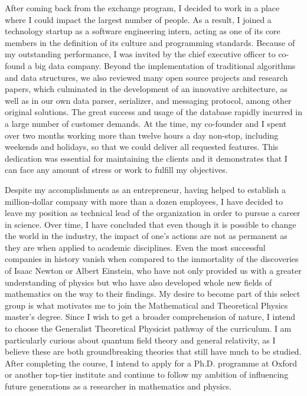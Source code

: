 \documentclass[10pt]{article}
\begin{document}
After coming back from the exchange program, I decided to work in a place where I could impact the largest number of people. As a result, I joined a technology startup as a software engineering intern, acting as one of its core members in the definition of its culture and programming standards. Because of my outstanding performance, I was invited by the chief executive officer to co-found a big data company. Beyond the implementation of traditional algorithms and data structures, we also reviewed many open source projects and research papers, which culminated in the development of an innovative architecture, as well as in our own data parser, serializer, and messaging protocol, among other original solutions. The great success and usage of the database rapidly incurred in a large number of customer demands. At the time, my co-founder and I spent over two months working more than twelve hours a day non-stop, including weekends and holidays, so that we could deliver all requested features. This dedication was essential for maintaining the clients and it demonstrates that I can face any amount of stress or work to fulfill my objectives.

Despite my accomplishments as an entrepreneur, having helped to establish a million-dollar company with more than a dozen employees, I have decided to leave my position as technical lead of the organization in order to pursue a career in science. Over time, I have concluded that even though it is possible to change the world in the industry, the impact of one's actions are not as permanent as they are when applied to academic disciplines. Even the most successful companies in history vanish when compared to the immortality of the discoveries of Isaac Newton or Albert Einstein, who have not only provided us with a greater understanding of physics but who have also developed whole new fields of mathematics on the way to their findings. My desire to become part of this select group is what motivates me to join the Mathematical and Theoretical Physics master's degree. Since I wish to get a broader comprehension of nature, I intend to choose the Generalist Theoretical Physicist pathway of the curriculum. I am particularly curious about quantum field theory and general relativity, as I believe these are both groundbreaking theories that still have much to be studied. After completing the course, I intend to apply for a Ph.D. programme at Oxford or another top-tier institute and continue to follow my ambition of influencing future generations as a researcher in mathematics and physics.
\end{document}
